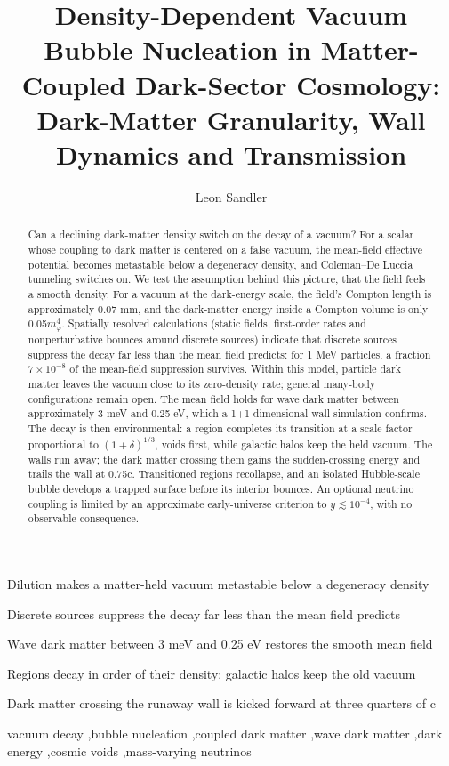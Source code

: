 \documentclass[preprint,12pt]{elsarticle}
\begin{document}
\begin{frontmatter}
\title{Density-Dependent Vacuum Bubble Nucleation in Matter-Coupled Dark-Sector Cosmology: Dark-Matter Granularity, Wall Dynamics and Transmission}
\author{Leon Sandler}
\begin{abstract}
Can a declining dark-matter density switch on the decay of a vacuum? For a scalar whose coupling to dark matter is centered on a false vacuum, the mean-field effective potential becomes metastable below a degeneracy density, and Coleman--De Luccia tunneling switches on. We test the assumption behind this picture, that the field feels a smooth density. For a vacuum at the dark-energy scale, the field's Compton length is approximately 0.07 mm, and the dark-matter energy inside a Compton volume is only 0.05$m_\varphi^4$. Spatially resolved calculations (static fields, first-order rates and nonperturbative bounces around discrete sources) indicate that discrete sources suppress the decay far less than the mean field predicts: for 1 MeV particles, a fraction $7\times10^{-8}$ of the mean-field suppression survives. Within this model, particle dark matter leaves the vacuum close to its zero-density rate; general many-body configurations remain open. The mean field holds for wave dark matter between approximately 3 meV and 0.25 eV, which a 1+1-dimensional wall simulation confirms. The decay is then environmental: a region completes its transition at a scale factor proportional to $(1+\delta)^{1/3}$, voids first, while galactic halos keep the held vacuum. The walls run away; the dark matter crossing them gains the sudden-crossing energy and trails the wall at 0.75c. Transitioned regions recollapse, and an isolated Hubble-scale bubble develops a trapped surface before its interior bounces. An optional neutrino coupling is limited by an approximate early-universe criterion to $y\lesssim10^{-4}$, with no observable consequence.
\end{abstract}
\begin{highlights}
\item Dilution makes a matter-held vacuum metastable below a degeneracy density
\item Discrete sources suppress the decay far less than the mean field predicts
\item Wave dark matter between 3 meV and 0.25 eV restores the smooth mean field
\item Regions decay in order of their density; galactic halos keep the old vacuum
\item Dark matter crossing the runaway wall is kicked forward at three quarters of c
\end{highlights}
\begin{keyword}
vacuum decay \sep bubble nucleation \sep coupled dark matter \sep wave dark matter \sep dark energy \sep cosmic voids \sep mass-varying neutrinos
\end{keyword}
\end{frontmatter}
\end{document}
